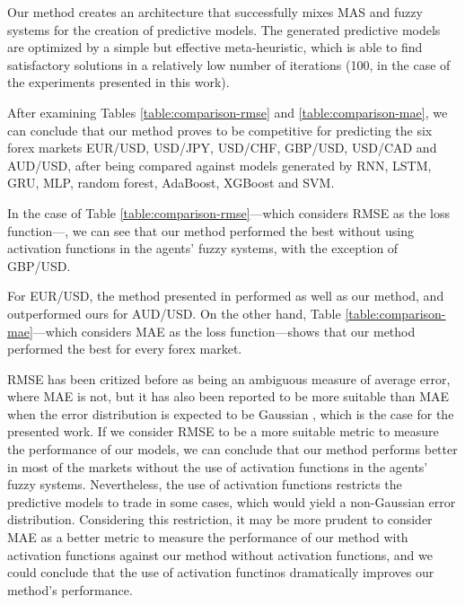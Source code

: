 ﻿\documentclass{ieeeaccess}
\begin{document}
Our method creates an architecture that successfully mixes MAS and
fuzzy systems for the creation of predictive models. The generated
predictive models are optimized by a simple but effective
meta-heuristic, which is able to find satisfactory solutions in a
relatively low number of iterations (100, in the case of the
experiments presented in this work). %

After examining Tables \ref{table:comparison-rmse} and
\ref{table:comparison-mae}, we can conclude that our method proves to
be competitive for predicting the six forex markets EUR/USD, USD/JPY,
USD/CHF, GBP/USD, USD/CAD and AUD/USD, after being compared against
models generated by RNN, LSTM, GRU, MLP, random forest, AdaBoost,
XGBoost and SVM.

In the case of Table \ref{table:comparison-rmse}---which
considers RMSE as the loss function---, we can see that our method
performed the best without using activation functions in the agents'
fuzzy systems, with the exception of GBP/USD. %

For EUR/USD, the method
presented in \cite{Munkhdalai2019} performed as well as our method,
and outperformed ours for AUD/USD. On the other hand,
Table
\ref{table:comparison-mae}---which considers MAE as the loss
function---shows that our method performed the best for every forex
market. %

RMSE has been critized before \cite{willmott2005advantages,willmott2009ambiguities} as being an ambiguous measure of
average error, where MAE is not, %
but it has also been reported to be
more suitable than MAE when the error distribution is expected to be
Gaussian \cite{chai2014root}, which is the case for the presented
work. If we consider RMSE to be a more suitable metric to measure the
performance of our models, we can conclude that our method performs
better in most of the markets without the use of activation functions
in the agents' fuzzy systems. Nevertheless, the use of activation
functions restricts the predictive models to trade in some cases,
which would yield a non-Gaussian error distribution. Considering this
restriction, it may be more prudent to consider MAE as a better metric
to measure the performance of our method with activation functions
against our method without activation functions, and we could conclude
that the use of activation functinos dramatically improves our
method's performance. %
\end{document}
